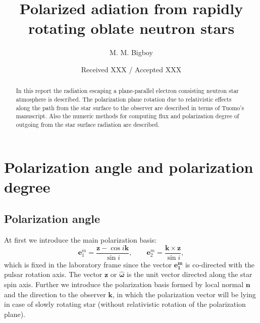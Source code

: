 \documentclass[iop, usenatbib]{emulateapj}
\newcommand{\be}{\begin{equation}}
\newcommand{\ee}{\end{equation}}
\begin{document}
\title{Polarized adiation from rapidly rotating oblate neutron stars}

\author{M. M. Bigboy }


\date{Received XXX / Accepted XXX}



\begin{abstract}
In this report the radiation escaping a plane-parallel electron consisting neutron star atmosphere is described.
The polarization plane rotation due to relativistic effects along the path from the star surface to the observer are described in terms of Tuomo's manuscript. 
Also the numeric methods for computing flux and polarization degree of outgoing from the star surface radiation are described. 
\lipsum[1]
\end{abstract}




\maketitle

\section{Polarization angle and polarization degree}
\subsection{Polarization angle }
At first we introduce the main polarization basis:
\be
\bm{e}_1^m = \frac{\bm{z}-\cos{i} \bm{k}}{\sin{i}},\qquad 
\bm{e}_2^m = \frac{\bm{k} \times \bm{z}}{\sin{i}},
\ee
which is fixed in the laboratory frame since the vector $\bm{e_1^m}$ is co-directed with the pulsar rotation axis.
The vector $\bm{z}$ or $\bm{\hat{\omega}}$ is the unit vector directed along the star spin axis.
Further we introduce the polarization basis formed by local normal $\bm{n}$ and the direction to the observer $\bm{k}$, in which the polarization vector will be lying in case of slowly rotating star (without relativistic rotation of the  polarization plane). 
\end{document}
